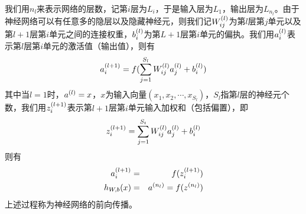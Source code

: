 我们用$n_l$来表示网络的层数，记第$i$层为$L_i$，于是输入层为$L_1$，输出层为$L_{n_l}$。由于神经网络可以有任意多的隐层以及隐藏神经元，则我们记$\samplet{W}{l}{ij}$为第$l$层第$j$单元以及第$l+1$层第$i$单元之间的连接权重，$\samplet{b}{l}{i	}$为第$L+1$层第$i$单元的偏执。我们用$\samplet{a}{l}{i}$表示第$l$层第$i$单元的激活值（输出值），则有
\begin{eqnarray}
\samplet{a}{l+1}{i}=f(\sum_{j=1}^{S_l}\samplet{W}{l}{ij}\samplet{a}{l}{j}+\samplet{b}{l}{i})
\end{eqnarray}
其中当$l=1$时，$\sample{a}{l}=x$，$x$为输入向量$(x_1,x_2,\cdots,x_{S_l})$，$S_l$指第$l$层的神经元个数，我们用$\samplet{z}{l+1}{i}$表示第$l+1$层第$i$单元输入加权和（包括偏置），即
\begin{eqnarray}
\samplet{z}{l+1}{i}=\sum_{j=1}^{S_t}\samplet{W}{l}{ij}\samplet{a}{l}{j}+\samplet{b}{l}{i}
\end{eqnarray}
则有
\begin{eqnarray}
\samplet{a}{l+1}{i}&=&f(\samplet{z}{l+1}{i})\\
h_{W,b}(x)&=&\sample{a}{n_l}=f(\sample{z}{n_l})
\end{eqnarray}
上述过程称为神经网络的前向传播。
